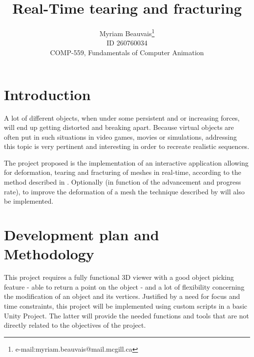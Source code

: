 \documentclass[tog]{acmsiggraph}
\title{Real-Time tearing and fracturing}
\author{Myriam Beauvais\thanks{e-mail:myriam.beauvais@mail.mcgill.ca} \\ ID 260760034 \\COMP-559, Fundamentals of Computer Animation}
\begin{document}


\maketitle

\copyrightspace

\section{Introduction}
A lot of different objects, when under some persistent and or increasing forces, will end up getting distorted and breaking apart. Because virtual objects are often put in such situations in video games, movies or simulations, addressing this topic is very pertinent and interesting in order to recreate realistic sequences.  

The project proposed is the implementation of an interactive application allowing for deformation, tearing and fracturing of meshes in real-time, according to the method described in \cite{Parker:2009:RTD}. Optionally (in function of the advancement and progress rate), to improve the deformation of a mesh the technique described by \cite{Rivers:2007:FFL} will also be implemented. 


\section{Development plan and Methodology}
This project requires a fully functional 3D viewer with a good object picking feature - able to return a point on the object - and a lot of flexibility concerning the modification of an object and its vertices. Justified by a need for focus and time constraints, this project will be implemented using custom scripts in a basic Unity Project. The latter will provide the needed functions and tools that are not directly related to the objectives of the project. 
\end{document}
